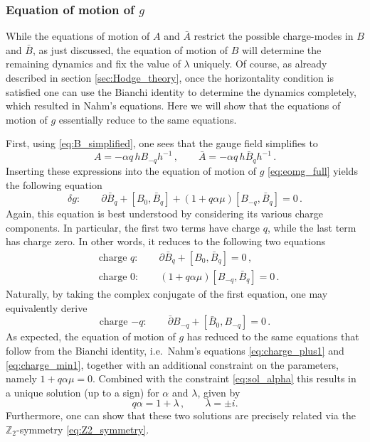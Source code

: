 \documentclass[11pt,a4paper]{article}
\numberwithin{equation}{section}
\numberwithin{table}{section}\setlength{\multlinegap}{25pt}
\begin{document}
\subsubsection{Equation of motion of $g$}

While the equations of motion of $A$ and $\bar{A}$ restrict the possible charge-modes in $B$ and $\bar{B}$, as just discussed, the equation of motion of $B$ will determine the remaining dynamics and fix the value of $\lambda$ uniquely. Of course, as already described in section \ref{sec:Hodge_theory}, once the horizontality condition is satisfied one can use the Bianchi identity to determine the dynamics completely, which resulted in Nahm's equations. Here we will show that the equations of motion of $g$ essentially reduce to the same equations.

First, using \eqref{eq:B_simplified}, one sees that the gauge field simplifies to
\begin{equation}
	A = -\alpha q\, hB_{-q}h^{-1}\,,\qquad \bar{A} = -\alpha q\, h \bar{B}_{q}h^{-1}\,.
\end{equation}
Inserting these expressions into the equation of motion of $g$ \eqref{eq:eomg_full} yields the following equation
\begin{equation}
	\delta g:\qquad \partial\bar{B}_{q}+[B_0,\bar{B}_q]+(1+q\alpha\mu)[B_{-q},\bar{B}_q]=0\,.
\end{equation}
Again, this equation is best understood by considering its various charge components. In particular, the first two terms have charge $q$, while the last term has charge zero. In other words, it reduces to the following two equations
\begin{align}
	&\text{charge $q$}:\qquad \partial\bar{B}_{q}+[B_0,\bar{B}_q]=0\,,\\
	&\text{charge 0}:\qquad (1+q\alpha\mu)[B_{-q},\bar{B}_q]=0\,.
\end{align}
Naturally, by taking the complex conjugate of the first equation, one may equivalently derive
\begin{equation}
	\text{charge $-q$}:\qquad \bar{\partial}B_{-q}+[\bar{B}_0,B_{-q}]=0\,.
\end{equation}
As expected, the equation of motion of $g$ has reduced to the same equations that follow from the Bianchi identity, i.e.~Nahm's equations \eqref{eq:charge_plus1} and \eqref{eq:charge_min1}, together with an additional constraint on the parameters, namely $1+q\alpha \mu=0$. Combined with the constraint \eqref{eq:sol_alpha} this results in a unique solution (up to a sign) for $\alpha$ and $\lambda$, given by
\begin{equation}\label{eq:alpha_sol}
	q\alpha = 1+\lambda\,,\qquad \lambda = \pm i.
\end{equation} 
Furthermore, one can show that these two solutions are precisely related via the $\mathbb{Z}_2$-symmetry \eqref{eq:Z2_symmetry}. 
\end{document}
